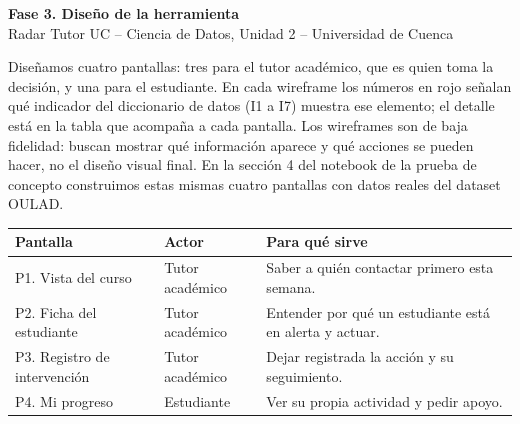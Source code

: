 \documentclass[10pt]{article}
\begin{document}
\begin{center}
{\Large\bfseries Fase 3. Diseño de la herramienta}\\[2pt]
Radar Tutor UC -- Ciencia de Datos, Unidad 2 -- Universidad de Cuenca
\end{center}

Diseñamos cuatro pantallas: tres para el tutor académico, que es quien toma la decisión, y una para el estudiante. En cada wireframe los números en rojo señalan qué indicador del diccionario de datos (I1 a I7) muestra ese elemento; el detalle está en la tabla que acompaña a cada pantalla. Los wireframes son de baja fidelidad: buscan mostrar qué información aparece y qué acciones se pueden hacer, no el diseño visual final. En la sección 4 del notebook de la prueba de concepto construimos estas mismas cuatro pantallas con datos reales del dataset OULAD.

\begin{center}
\begin{tabular}{P{5.5cm} P{4cm} P{11cm}}
\toprule
\textbf{Pantalla} & \textbf{Actor} & \textbf{Para qué sirve}\\
\midrule
P1. Vista del curso & Tutor académico & Saber a quién contactar primero esta semana.\\
P2. Ficha del estudiante & Tutor académico & Entender por qué un estudiante está en alerta y actuar.\\
P3. Registro de intervención & Tutor académico & Dejar registrada la acción y su seguimiento.\\
P4. Mi progreso & Estudiante & Ver su propia actividad y pedir apoyo.\\
\bottomrule
\end{tabular}
\end{center}

\newpage
\end{document}
